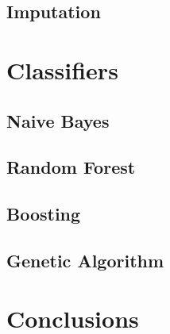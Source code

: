 \documentclass[11pt, oneside]{article}   	%
\begin{document}
	\subsection{Imputation}
\section{Classifiers}
	\subsection{Naive Bayes}
	\subsection{Random Forest}
	\subsection{Boosting}
	\subsection{Genetic Algorithm}
\section{Conclusions}
\end{document}
